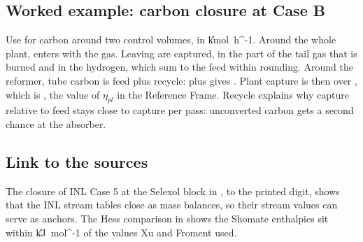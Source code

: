 \subsection*{Worked example: carbon closure at Case B}
Use  for carbon around two control volumes, in \U{kmol\ h^{-1}}. Around the whole plant, \cFeedC{} enters with the gas. Leaving are \cCapC{} captured, \cBurnC{} in the part of the tail gas that is burned and \cProdC{} in the hydrogen, which sum to the feed within rounding. Around the reformer, tube carbon is feed plus recycle: \cFeedC{} plus \cRecyC{} gives \cTubeC. Plant capture is then \cCapC{} over \cFeedC, which is \vEtaPl, the value of $\eta_{pl}$ in the Reference Frame. Recycle explains why capture relative to feed stays close to capture per pass: unconverted carbon gets a second chance at the absorber.

\subsection*{Link to the sources}
The closure of INL Case 5 at the Selexol block in , to the printed digit, shows that the INL stream tables close as mass balances, so their stream values can serve as anchors. The Hess comparison in  shows the Shomate enthalpies sit within \cDhGapMax{} \U{kJ\ mol^{-1}} of the values Xu and Froment used.
